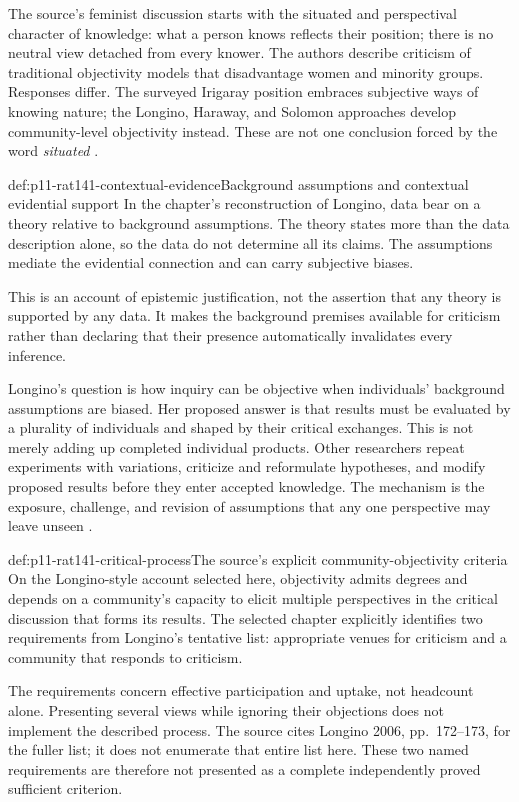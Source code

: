 The source's feminist discussion starts with the situated and
perspectival character of knowledge: what a person knows reflects
their position; there is no neutral view detached from every knower.
The authors describe criticism of traditional objectivity models that
disadvantage women and minority groups. Responses differ. The
surveyed Irigaray position embraces subjective ways of knowing nature;
the Longino, Haraway, and Solomon approaches develop community-level
objectivity instead. These are not one conclusion forced by the word
\emph{situated} \parencite[p.~751]{AndersenAndersen2021Scientific}.

\begin{hbdefinition}{def:p11-rat141-contextual-evidence}{Background assumptions and contextual evidential support}
In the chapter's reconstruction of Longino, data bear on a theory
relative to background assumptions. The theory states more than the
data description alone, so the data do not determine all its claims.
The assumptions mediate the evidential connection and can carry
subjective biases.

This is an account of epistemic justification, not the assertion that
any theory is supported by any data. It makes the background premises
available for criticism rather than declaring that their presence
automatically invalidates every inference.
\end{hbdefinition}

Longino's question is how inquiry can be objective when individuals'
background assumptions are biased. Her proposed answer is that results
must be evaluated by a plurality of individuals and shaped by their
critical exchanges. This is not merely adding up completed individual
products. Other researchers repeat experiments with variations,
criticize and reformulate hypotheses, and modify proposed results
before they enter accepted knowledge. The mechanism is the exposure,
challenge, and revision of assumptions that any one perspective may
leave unseen \parencite[p.~751]{AndersenAndersen2021Scientific}.

\begin{hbdefinition}{def:p11-rat141-critical-process}{The source's explicit community-objectivity criteria}
On the Longino-style account selected here, objectivity admits degrees
and depends on a community's capacity to elicit multiple perspectives
in the critical discussion that forms its results. The selected chapter
explicitly identifies two requirements from Longino's tentative list:
appropriate venues for criticism and a community that responds to
criticism.

The requirements concern effective participation and uptake, not
headcount alone. Presenting several views while ignoring their objections
does not implement the described process. The source cites Longino
2006, pp.~172--173, for the fuller list; it does not enumerate that
entire list here. These two named requirements are therefore not
presented as a complete independently proved sufficient criterion.
\end{hbdefinition}

